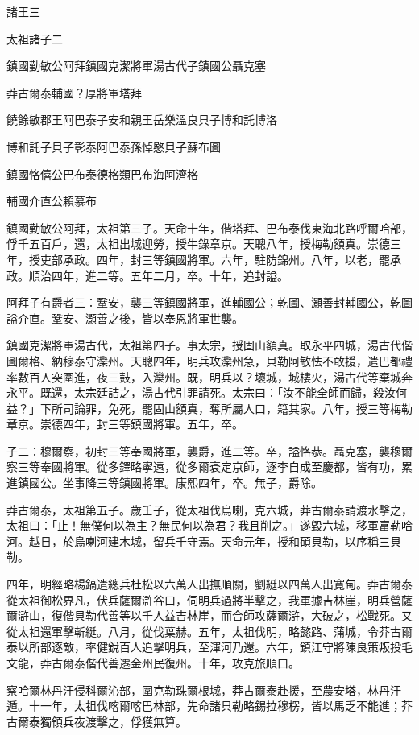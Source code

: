 
\begin{pinyinscope}
諸王三

太祖諸子二

鎮國勤敏公阿拜鎮國克潔將軍湯古代子鎮國公聶克塞

莽古爾泰輔國？厚將軍塔拜

饒餘敏郡王阿巴泰子安和親王岳樂溫良貝子博和託博洛

博和託子貝子彰泰阿巴泰孫悼愍貝子蘇布圖

鎮國恪僖公巴布泰德格類巴布海阿濟格

輔國介直公賴慕布

鎮國勤敏公阿拜，太祖第三子。天命十年，偕塔拜、巴布泰伐東海北路呼爾哈部，俘千五百戶，還，太祖出城迎勞，授牛錄章京。天聰八年，授梅勒額真。崇德三年，授吏部承政。四年，封三等鎮國將軍。六年，駐防錦州。八年，以老，罷承政。順治四年，進二等。五年二月，卒。十年，追封謚。

阿拜子有爵者三：鞏安，襲三等鎮國將軍，進輔國公；乾圖、灝善封輔國公，乾圖謚介直。鞏安、灝善之後，皆以奉恩將軍世襲。

鎮國克潔將軍湯古代，太祖第四子。事太宗，授固山額真。取永平四城，湯古代偕圖爾格、納穆泰守灤州。天聰四年，明兵攻灤州急，貝勒阿敏怯不敢援，遣巴都禮率數百人突圍進，夜三鼓，入灤州。既，明兵以？壞城，城樓火，湯古代等棄城奔永平。既還，太宗廷詰之，湯古代引罪請死。太宗曰：「汝不能全師而歸，殺汝何益？」下所司論罪，免死，罷固山額真，奪所屬人口，籍其家。八年，授三等梅勒章京。崇德四年，封三等鎮國將軍。五年，卒。

子二：穆爾察，初封三等奉國將軍，襲爵，進二等。卒，謚恪恭。聶克塞，襲穆爾察三等奉國將軍。從多鐸略寧遠，從多爾袞定京師，逐李自成至慶都，皆有功，累進鎮國公。坐事降三等鎮國將軍。康熙四年，卒。無子，爵除。

莽古爾泰，太祖第五子。歲壬子，從太祖伐烏喇，克六城，莽古爾泰請渡水擊之，太祖曰：「止！無僕何以為主？無民何以為君？我且削之。」遂毀六城，移軍富勒哈河。越日，於烏喇河建木城，留兵千守焉。天命元年，授和碩貝勒，以序稱三貝勒。

四年，明經略楊鎬遣總兵杜松以六萬人出撫順關，劉綎以四萬人出寬甸。莽古爾泰從太祖御松界凡，伏兵薩爾滸谷口，伺明兵過將半擊之，我軍據吉林崖，明兵營薩爾滸山，復偕貝勒代善等以千人益吉林崖，而合師攻薩爾滸，大破之，松戰死。又從太祖還軍擊斬綎。八月，從伐葉赫。五年，太祖伐明，略懿路、蒲城，令莽古爾泰以所部逐敵，率健銳百人追擊明兵，至渾河乃還。六年，鎮江守將陳良策叛投毛文龍，莽古爾泰偕代善遷金州民復州。十年，攻克旅順口。

察哈爾林丹汗侵科爾沁部，圍克勒珠爾根城，莽古爾泰赴援，至農安塔，林丹汗遁。十一年，太祖伐喀爾喀巴林部，先命諸貝勒略錫拉穆楞，皆以馬乏不能進；莽古爾泰獨領兵夜渡擊之，俘獲無算。


\end{pinyinscope}
